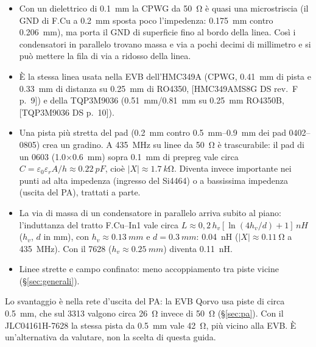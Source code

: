 \documentclass[a4paper,10pt]{article}
\newcommand{\fonte}[1]{{\footnotesize\color{sbgray}[#1]}}
\begin{document}
\begin{perche}
\begin{itemize}
\item Con un dielettrico di \SI{0.1}{mm} la CPWG da \SI{50}{\ohm} è quasi una microstriscia (il GND di F.Cu
      a \SI{0.2}{mm} sposta poco l'impedenza: \SI{0.175}{mm} contro \SI{0.206}{mm}), ma porta il GND di
      superficie fino al bordo della linea. Così i condensatori in parallelo trovano massa e via a pochi
      decimi di millimetro e si può mettere la fila di via a ridosso della linea.
\item È la stessa linea usata nella EVB dell'HMC349A (CPWG, \SI{0.41}{mm} di pista e \SI{0.33}{mm} di
      distanza su \SI{0.25}{mm} di RO4350, \fonte{HMC349AMS8G DS rev.~F p.~9}) e della TQP3M9036
      (\SI{0.51}{mm}/\SI{0.81}{mm} su \SI{0.25}{mm} RO4350B, \fonte{TQP3M9036 DS p.~10}).
\item Una pista più stretta del pad (\SI{0.2}{mm} contro \SIrange{0.5}{0.9}{mm} dei pad 0402--0805) crea un
      gradino. A \SI{435}{MHz} su linee da \SI{50}{\ohm} è trascurabile: il pad di un 0603
      (\SI{1.0}{}$\times$\SI{0.6}{mm}) sopra \SI{0.1}{mm} di prepreg vale circa
      $C=\varepsilon_0\varepsilon_r A/h\approx\SI{0.22}{pF}$, cioè $|X|\approx\SI{1.7}{k\ohm}$. Diventa invece
      importante nei punti ad alta impedenza (ingresso del Si4464) o a bassissima impedenza (uscita del PA),
      trattati a parte.
\end{itemize}
\end{perche}

\begin{perche}
\begin{itemize}
\item La via di massa di un condensatore in parallelo arriva subito al piano: l'induttanza del tratto
      F.Cu--In1 vale circa $L\approx 0{,}2\,h_v\left[\ln(4h_v/d)+1\right]\,\si{nH}$ ($h_v$, $d$ in mm),
      con $h_v\approx\SI{0.13}{mm}$ e $d=\SI{0.3}{mm}$: \SI{0.04}{nH} ($|X|\approx\SI{0.11}{\ohm}$ a
      \SI{435}{MHz}). Con il 7628 ($h_v\approx\SI{0.25}{mm}$) diventa \SI{0.11}{nH}.
\item Linee strette e campo confinato: meno accoppiamento tra piste vicine (\S\ref{sec:generali}).
\end{itemize}
Lo svantaggio è nella rete d'uscita del PA: la EVB Qorvo usa piste di circa \SI{0.5}{mm}, che sul 3313
valgono circa \SI{26}{\ohm} invece di \SI{50}{\ohm} (\S\ref{sec:pa}). Con il JLC04161H-7628 la stessa pista
da \SI{0.5}{mm} vale \SI{42}{\ohm}, più vicino alla EVB. È un'alternativa da valutare, non la scelta di
questa guida.
\end{perche}
\end{document}
